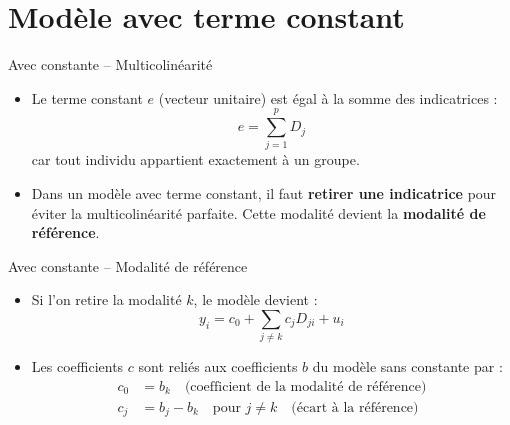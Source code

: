 \documentclass[11pt,aspectratio=169]{beamer}
\begin{document}
\section{Modèle avec terme constant}

\begin{frame}{Avec constante -- Multicolinéarité}

\begin{itemize}

\item Le terme constant $e$ (vecteur unitaire) est égal à la somme des indicatrices :
  \[
  e = \sum_{j=1}^{p} D_j
  \]
  car tout individu appartient exactement à un groupe.\newline

\item Dans un modèle avec terme constant, il faut \textbf{retirer une indicatrice} pour éviter la multicolinéarité parfaite. Cette modalité devient la \textbf{modalité de référence}.

\end{itemize}

\end{frame}

\begin{frame}{Avec constante -- Modalité de référence}

\begin{itemize}

\item Si l'on retire la modalité $k$, le modèle devient :
  \[
  y_i = c_0 + \sum_{j \neq k} c_j D_{ji} + u_i
  \]\newline

\item Les coefficients $c$ sont reliés aux coefficients $b$ du modèle sans constante par :
  \begin{align*}
      c_0 &= b_k \quad \text{(coefficient de la modalité de référence)} \\
      c_j &= b_j - b_k \quad \text{pour } j \neq k \quad \text{(écart à la référence)}
  \end{align*}

\end{itemize}

\end{frame}
\end{document}

